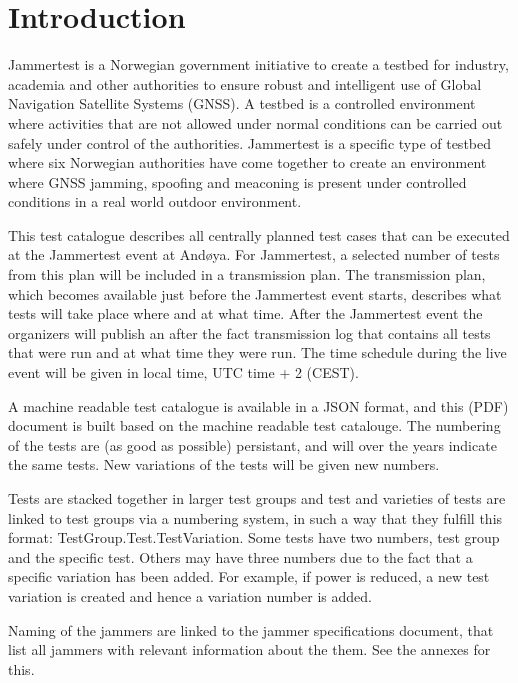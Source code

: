 \documentclass[a4paper]{book}
\begin{document}
\pagebreak

\tableofcontents

\section{Introduction}
Jammertest is a Norwegian government initiative to create a testbed for industry, academia and other authorities to ensure robust and intelligent use of Global Navigation Satellite Systems (GNSS). A testbed is a controlled environment where activities that are not allowed under normal conditions can be carried out safely under control of the authorities. Jammertest is a specific type of testbed where six Norwegian authorities have come together to create an environment where GNSS jamming, spoofing and meaconing is present under controlled conditions in a real world outdoor environment.\newline

This test catalogue describes all centrally planned test cases that can be executed at the Jammertest event at Andøya. For Jammertest, a selected number of tests from this plan will be included in a transmission plan. The transmission plan, which becomes available just before the Jammertest event starts, describes what tests will take place where and at what time. After the Jammertest event the organizers will publish an after the fact transmission log that contains all tests that were run and at what time they were run. The time schedule during the live event will be given in local time, UTC time + 2 (CEST).\newline

A machine readable test catalogue is available in a JSON format, and this (PDF) document is built based on the machine readable test catalouge. The numbering of the tests are (as good as possible) persistant, and will over the years indicate the same tests. New variations of the tests will be given new numbers.

Tests are stacked together in larger test groups and test and varieties of tests are linked to test groups via a numbering system, in such a way that they fulfill this format: TestGroup.Test.TestVariation. Some tests have two numbers, test group and the specific test. Others may have three numbers due to the fact that a specific variation has been added. For example, if power is reduced, a new test variation is created and hence a variation number is added.\newline

Naming of the jammers are linked to the jammer specifications document, that list all jammers with relevant information about the them. See the annexes for this.\newline
\end{document}
